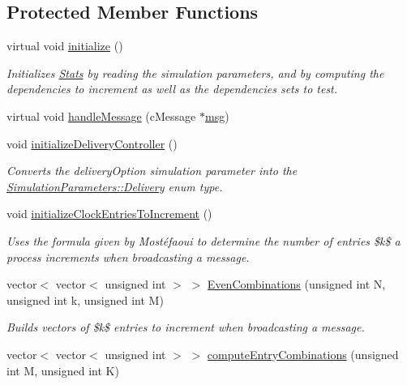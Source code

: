 \subsection*{Protected Member Functions}
\begin{DoxyCompactItemize}
\item 
virtual void \hyperlink{class_simulation_parameters_a1fa495ef59a10cb9a0aff42f3e2625ef}{initialize} ()
\begin{DoxyCompactList}\small\item\em Initializes \hyperlink{class_stats}{Stats} by reading the simulation parameters, and by computing the dependencies to increment as well as the dependencies sets to test. \end{DoxyCompactList}\item 
virtual void \hyperlink{class_simulation_parameters_a8983c7bf9d840f8b4a9a4d55c04d581a}{handle\+Message} (c\+Message $\ast$\hyperlink{_controller_8h_afa0f3b802fbc219228f7bb97996fa558}{msg})
\item 
void \hyperlink{class_simulation_parameters_afec1fdd41805feba54ad575a4542aab1}{initialize\+Delivery\+Controller} ()
\begin{DoxyCompactList}\small\item\em Converts the delivery\+Option simulation parameter into the \hyperlink{class_simulation_parameters_ae08444273809241f502aa422205f7307}{Simulation\+Parameters\+::\+Delivery} enum type. \end{DoxyCompactList}\item 
void \hyperlink{class_simulation_parameters_aeef091d6ca357795fa7ff6b3661fb2fd}{initialize\+Clock\+Entries\+To\+Increment} ()
\begin{DoxyCompactList}\small\item\em Uses the formula given by Mostéfaoui to determine the number of entries \$k\$ a process increments when broadcasting a message. \end{DoxyCompactList}\item 
vector$<$ vector$<$ unsigned int $>$ $>$ \hyperlink{class_simulation_parameters_ae7a743b60e8ac2352e4845b104038bde}{Even\+Combinations} (unsigned int N, unsigned int k, unsigned int M)
\begin{DoxyCompactList}\small\item\em Builds vectors of \$k\$ entries to increment when broadcasting a message. \end{DoxyCompactList}\item 
vector$<$ vector$<$ unsigned int $>$ $>$ \hyperlink{class_simulation_parameters_ae665fb3295f28d46514597f88c690d4a}{compute\+Entry\+Combinations} (unsigned int M, unsigned int K)

\end{DoxyCompactItemize}
